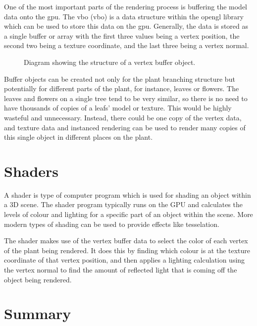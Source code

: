 One of the most important parts of the rendering process is buffering the model data onto the \acrshort{gpu}. The \acrlong{vbo} (\acrshort{vbo}) is a data structure within the \acrshort{opengl} library which can be used to store this data on the \acrshort{gpu}. Generally, the data is stored as a single buffer or array with the first three values being a vertex position, the second two being a texture coordinate, and the last three being a vertex normal.

\begin{figure}[htbp]
	{\centering
		\vspace{7px}
		\setlength{\fboxrule}{1pt}
		\caption{Diagram showing the structure of a vertex buffer object.}
	}
\end{figure}
\FloatBarrier

\noindent
Buffer objects can be created not only for the plant branching structure but potentially for different parts of the plant, for instance, leaves or flowers. The leaves and flowers on a single tree tend to be very similar, so there is no need to have thousands of copies of a leafs' model or texture. This would be highly wasteful and unnecessary. Instead, there could be one copy of the vertex data, and texture data and instanced rendering can be used to render many copies of this single object in different places on the plant. 

\section{Shaders}

A shader is type of computer program which is used for shading an object within a 3D scene. The shader program typically runs on the GPU and calculates the levels of colour and lighting for a specific part of an object within the scene. More modern types of shading can be used to provide effects like tesselation. 

The shader makes use of the vertex buffer data to select the color of each vertex of the plant being rendered. It does this by finding which colour is at the texture coordinate of that vertex position, and then applies a lighting calculation using the vertex normal to find the amount of reflected light that is coming off the object being rendered. 

\section{Summary}


